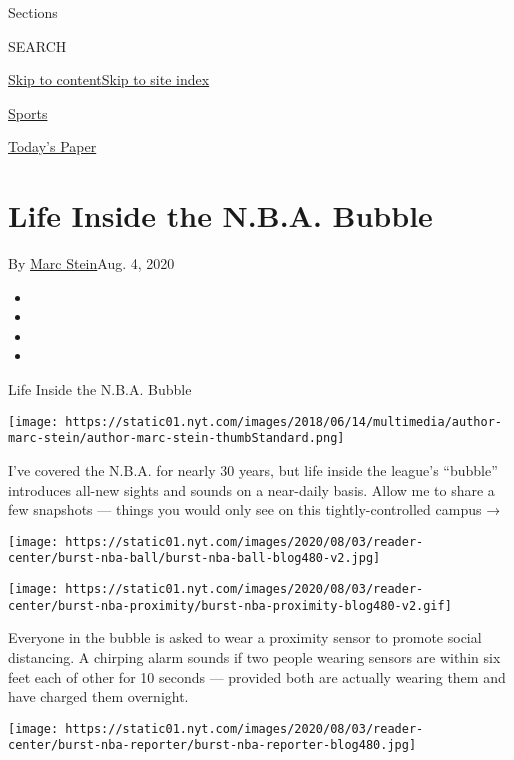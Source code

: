 Sections

SEARCH

\protect\hyperlink{site-content}{Skip to
content}\protect\hyperlink{site-index}{Skip to site index}

\href{https://www.nytimes.com/section/sports}{Sports}

\href{https://myaccount.nytimes.com/auth/login?response_type=cookie\&client_id=vi}{}

\href{https://www.nytimes.com/section/todayspaper}{Today's Paper}

\hypertarget{life-inside-the-nba-bubble}{%
\section{Life Inside the N.B.A.
Bubble}\label{life-inside-the-nba-bubble}}

By \href{https://www.nytimes.com/by/marc-stein}{Marc Stein}Aug. 4, 2020

\begin{itemize}
\item
\item
\item
\item
\end{itemize}

Life Inside the N.B.A. Bubble

\texttt{[image: https://static01.nyt.com/images/2018/06/14/multimedia/author-marc-stein/author-marc-stein-thumbStandard.png]}

I've covered the N.B.A. for nearly 30 years, but life inside the
league's ``bubble'' introduces all-new sights and sounds on a near-daily
basis. Allow me to share a few snapshots --- things you would only see
on this tightly-controlled campus →

\texttt{[image: https://static01.nyt.com/images/2020/08/03/reader-center/burst-nba-ball/burst-nba-ball-blog480-v2.jpg]}

\texttt{[image: https://static01.nyt.com/images/2020/08/03/reader-center/burst-nba-proximity/burst-nba-proximity-blog480-v2.gif]}

Everyone in the bubble is asked to wear a proximity sensor to promote
social distancing. A chirping alarm sounds if two people wearing sensors
are within six feet each of other for 10 seconds --- provided both are
actually wearing them and have charged them overnight.

\texttt{[image: https://static01.nyt.com/images/2020/08/03/reader-center/burst-nba-reporter/burst-nba-reporter-blog480.jpg]}

